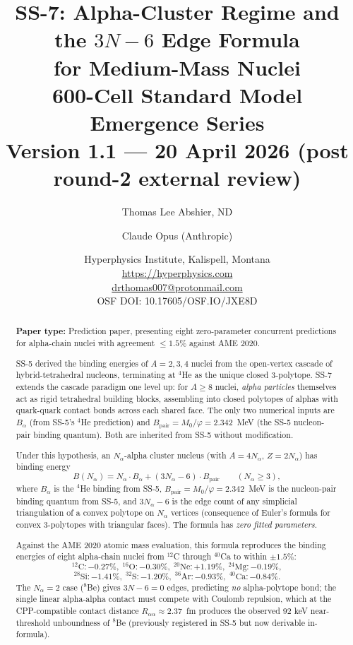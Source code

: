 \documentclass[11pt,letterpaper]{article}
\title{\textbf{SS-7: Alpha-Cluster Regime and the $3N-6$ Edge Formula\\ for Medium-Mass Nuclei}\\[6pt]
{\large 600-Cell Standard Model Emergence Series}\\[4pt]
{\normalsize Version 1.1 --- 20 April 2026 (post round-2 external review)}}
\author{Thomas Lee Abshier, ND \and Claude Opus (Anthropic)}
\date{\normalsize Hyperphysics Institute, Kalispell, Montana\\
\url{https://hyperphysics.com}\\
\href{mailto:drthomas007@protonmail.com}{drthomas007@protonmail.com}\\[4pt]
\small OSF DOI: 10.17605/OSF.IO/JXE8D}
\newcommand{\phig}{\varphi}
\newcommand{\Mzero}{M_0}
\newcommand{\Bpair}{B_{\mathrm{pair}}}
\newcommand{\Balpha}{B_{\alpha}}
\newcommand{\Nalpha}{N_{\alpha}}
\newcommand{\Raa}{R_{\alpha\alpha}}
\begin{document}
\maketitle

\begin{abstract}
\noindent\textbf{Paper type:} Prediction paper, presenting eight zero-parameter concurrent predictions for alpha-chain nuclei with agreement $\leq 1.5\%$ against AME 2020.

SS-5 derived the binding energies of $A = 2, 3, 4$ nuclei from the open-vertex cascade of hybrid-tetrahedral nucleons, terminating at ${}^4$He as the unique closed 3-polytope. SS-7 extends the cascade paradigm one level up: for $A \geq 8$ nuclei, \emph{alpha particles} themselves act as rigid tetrahedral building blocks, assembling into closed polytopes of alphas with quark-quark contact bonds across each shared face. The only two numerical inputs are $\Balpha$ (from SS-5's ${}^4$He prediction) and $\Bpair = \Mzero/\phig = 2.342$~MeV (the SS-5 nucleon-pair binding quantum). Both are inherited from SS-5 without modification.

Under this hypothesis, an $N_\alpha$-alpha cluster nucleus (with $A = 4N_\alpha$, $Z = 2N_\alpha$) has binding energy
\[
B(\Nalpha) = \Nalpha \cdot \Balpha + (3\Nalpha - 6) \cdot \Bpair \qquad (\Nalpha \geq 3),
\]
where $\Balpha$ is the $^4$He binding from SS-5, $\Bpair = \Mzero/\phig = 2.342$~MeV is the nucleon-pair binding quantum from SS-5, and $3\Nalpha - 6$ is the edge count of any simplicial triangulation of a convex polytope on $\Nalpha$ vertices (consequence of Euler's formula for convex 3-polytopes with triangular faces). The formula has \emph{zero fitted parameters}.

Against the AME 2020 atomic mass evaluation, this formula reproduces the binding energies of eight alpha-chain nuclei from ${}^{12}$C through ${}^{40}$Ca to within $\pm 1.5\%$:
\[
{}^{12}\mathrm{C}: -0.27\%, \; {}^{16}\mathrm{O}: -0.30\%, \; {}^{20}\mathrm{Ne}: +1.19\%, \; {}^{24}\mathrm{Mg}: -0.19\%,
\]
\[
{}^{28}\mathrm{Si}: -1.41\%, \; {}^{32}\mathrm{S}: -1.20\%, \; {}^{36}\mathrm{Ar}: -0.93\%, \; {}^{40}\mathrm{Ca}: -0.84\%.
\]
The $N_\alpha = 2$ case (${}^8$Be) gives $3N - 6 = 0$ edges, predicting \emph{no} alpha-polytope bond; the single linear alpha-alpha contact must compete with Coulomb repulsion, which at the CPP-compatible contact distance $\Raa \approx 2.37$~fm produces the observed 92 keV near-threshold unboundness of ${}^8$Be (previously registered in SS-5 but now derivable in-formula).


\end{abstract}
\end{document}
